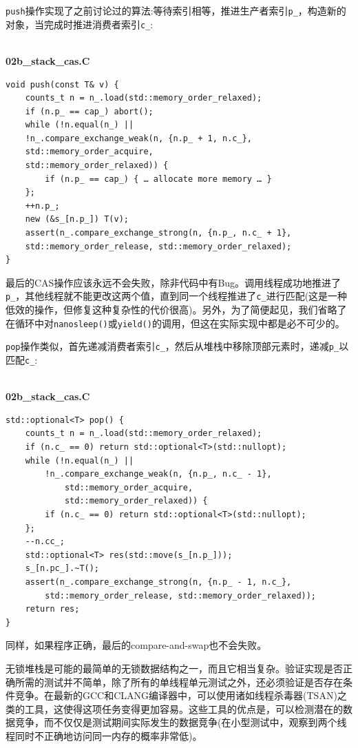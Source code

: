 \texttt{push}操作实现了之前讨论过的算法:等待索引相等，推进生产者索引\texttt{p\_}，构造新的对象，当完成时推进消费者索引\texttt{c\_}:

\hspace*{\fill} \\ %
\noindent
\textbf{02b\_stack\_cas.C}
\begin{lstlisting}[style=styleCXX]
void push(const T& v) {
	counts_t n = n_.load(std::memory_order_relaxed);
	if (n.p_ == cap_) abort();
	while (!n.equal(n_) ||
	!n_.compare_exchange_weak(n, {n.p_ + 1, n.c_},
	std::memory_order_acquire,
	std::memory_order_relaxed)) {
		if (n.p_ == cap_) { … allocate more memory … }
	};
	++n.p_;
	new (&s_[n.p_]) T(v);
	assert(n_.compare_exchange_strong(n, {n.p_, n.c_ + 1},
	std::memory_order_release, std::memory_order_relaxed);
}
\end{lstlisting}

最后的CAS操作应该永远不会失败，除非代码中有Bug。调用线程成功地推进了\texttt{p\_}，其他线程就不能更改这两个值，直到同一个线程推进了\texttt{c\_}进行匹配(这是一种低效的操作，但修复这种复杂性的代价很高)。另外，为了简便起见，我们省略了在循环中对\texttt{nanosleep()}或\texttt{yield()}的调用，但这在实际实现中都是必不可少的。

\texttt{pop}操作类似，首先递减消费者索引\texttt{c\_}，然后从堆栈中移除顶部元素时，递减\texttt{p\_}以匹配\texttt{c\_}:

\hspace*{\fill} \\ %
\noindent
\textbf{02b\_stack\_cas.C}
\begin{lstlisting}[style=styleCXX]
std::optional<T> pop() {
	counts_t n = n_.load(std::memory_order_relaxed);
	if (n.c_ == 0) return std::optional<T>(std::nullopt);
	while (!n.equal(n_) ||
		!n_.compare_exchange_weak(n, {n.p_, n.c_ - 1},
			std::memory_order_acquire,
			std::memory_order_relaxed)) {
		if (n.c_ == 0) return std::optional<T>(std::nullopt);
	};
	--n.cc_;
	std::optional<T> res(std::move(s_[n.p_]));
	s_[n.pc_].~T();
	assert(n_.compare_exchange_strong(n, {n.p_ - 1, n.c_},
		std::memory_order_release, std::memory_order_relaxed));
	return res;
}
\end{lstlisting}

同样，如果程序正确，最后的compare-and-swap也不会失败。

无锁堆栈是可能的最简单的无锁数据结构之一，而且它相当复杂。验证实现是否正确所需的测试并不简单，除了所有的单线程单元测试之外，还必须验证是否存在条件竞争。在最新的GCC和CLANG编译器中，可以使用诸如线程杀毒器(TSAN)之类的工具，这使得这项任务变得更加容易。这些工具的优点是，可以检测潜在的数据竞争，而不仅仅是测试期间实际发生的数据竞争(在小型测试中，观察到两个线程同时不正确地访问同一内存的概率非常低)。

